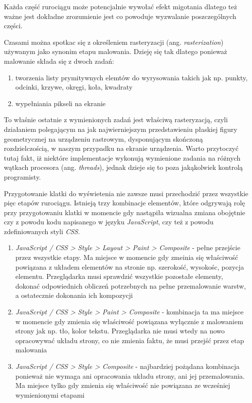 \documentclass[polish, twoside, 12pt]{mwart}
\begin{document}
Każda część rurociągu może potencjalnie wywołać efekt migotania dlatego też ważne jest dokładne zrozumienie jest co powoduje wyzwalanie poszczególnych części.

Czasami można spotkac się z określeniem rasteryzacji (ang. \emph{rasterization}) używanym jako synonim etapu malowania. Dzieję się tak dlatego ponieważ malowanie składa się z dwoch zadań:

\begin{enumerate}
  \item tworzenia listy prymitywnych elemtów do wyrysowania takich jak np. punkty, odcinki, krzywe, okręgi, koła, kwadraty
  \item wypełniania pikseli na ekranie
\end{enumerate}

To właśnie ostatnie z wymienionych zadań jest właściwą rasteryzacją, czyli działaniem polegającym na jak najwierniejszym przedstawieniu płaskiej figury geometrycznej na urządzeniu rastrowym, dysponującym skończoną rozdzielczością, w naszym przypadku na ekranie urządzenia. Warto przytoczyć tutaj fakt, iż niektóre implementacje wykonują wymienione zadania na różnych wątkach procesora (ang. \emph{threads}), jednak dzieje się to poza jakąkolwiek kontrolą programisty.

Przygotowanie klatki do wyświetenia nie zawsze musi przechodzić przez wszystkie pięc etapów rurociągu. Istnieją trzy kombinacje elementów, które odgrywają rolę przy przygotowaniu klatki w momencie gdy nastąpiła wizualna zmiana obojętnie czy z powodu kodu napisanego w języku \emph{JavaScript}, czy też z powodu zdefiniowanych styli \emph{CSS}.

\begin{enumerate}
  \item \emph{JavaScript / CSS > Style > Layout > Paint > Composite} - pełne przejście przez wszystkie etapy. Ma miejsce w momencie gdy zmeinia się właściwość powiązana z układem elementów na stronie np. szerokość, wysokośc, pozycja elementu. Przeglądarka musi sprawdzić wszystkie pozostałe elementy, dokonać odpowiednich obliczeń potrzebnych na pełne przemalowanie warstw, a ostatecznie dokonania ich kompozycji
  \item \emph{JavaScript / CSS > Style > Paint > Composite} - kombinacja ta ma miejsce w momencie gdy zmienia się właściwość powiązana wyłącznie z malowaniem strony jak np. tło, kolor tekstu. Przeglądarka nie musi wtedy na nowo opracowywać układu strony, co nie zmienia faktu, że musi przejść przez etap malowania
  \item \emph{JavaScript / CSS > Style > Composite} - najbardziej pożądana kombinacja ponieważ nie wymaga ani opracowania układu strony, ani jej przemalowania. Ma miejsce tylko gdy zmienia się właściwość nie powiązana ze wcześniej wymienionymi etapami
\end{enumerate}
\end{document}
